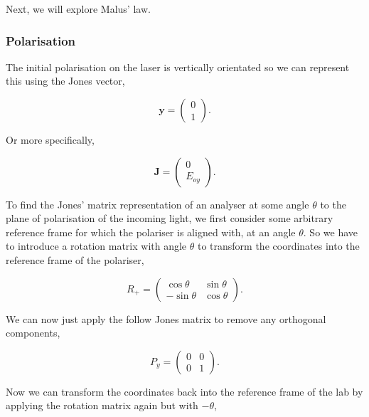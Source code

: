 \documentclass{article}
\begin{document}
Next, we will explore Malus' law. 

\subsubsection{Polarisation}
The initial polarisation on the laser is vertically orientated 
so we can represent this using the Jones vector,

\begin{equation}
    \textbf{y} = \begin{pmatrix}
        0 \\
        1
    \end{pmatrix}.
\end{equation}

Or more specifically,

\begin{equation} \label{eq:J}
    \textbf{J} =\begin{pmatrix}
        0 \\
        E_{oy}
    \end{pmatrix}.
\end{equation}

To find the Jones' matrix representation of an analyser at some angle 
$\theta$ to the plane of polarisation of the incoming light, we first 
consider some arbitrary reference frame for which the polariser is 
aligned with, at an angle $\theta$. So we have to introduce a rotation
matrix with angle $\theta$ to transform the coordinates into the reference 
frame of the polariser,

\begin{equation}
    \textbf{$R_+$} = \begin{pmatrix}
        \cos{\theta} & \sin{\theta} \\
        -\sin{\theta} & \cos{\theta}
    \end{pmatrix}.
\end{equation}

We can now just apply the follow Jones matrix to remove any orthogonal 
components,

\begin{equation}
    \textbf{$P_y$} = \begin{pmatrix}
        0 & 0 \\
        0 & 1
    \end{pmatrix}.
\end{equation}

Now we can transform the coordinates back into the reference frame of 
the lab by applying the rotation matrix again but with $-\theta$,
\end{document}
